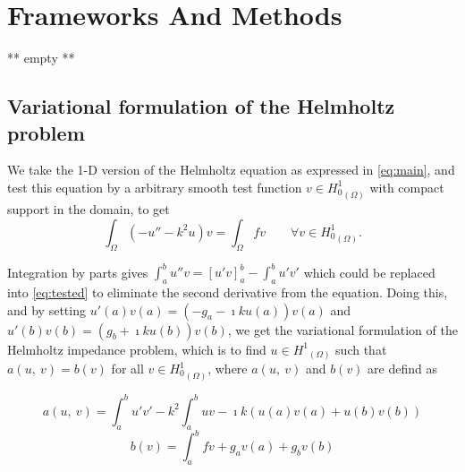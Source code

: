 \section{Frameworks And Methods}\label{sec:frameworks}
** empty **

\subsection{Variational formulation of the Helmholtz problem}\label{sec:variational}

We take the 1-D version of the Helmholtz equation as expressed in \autoref{eq:main}, and test this equation by a arbitrary smooth test function $v \in {H_{0}^{1} }_{(\Omega)}$ with compact support in the domain, to get
\begin{equation}
    \label{eq:tested}
    \int_{\Omega}{{(-u'' - k^2u)}v} = \int_{\Omega}{fv} \qquad \forall v \in {H_{0}^{1} }_{(\Omega)}.
\end{equation}

Integration by parts gives $\int_{a}^{b}{u''v} = [u'v]_{a}^{b} - \int_{a}^{b}{u'v'}$ which could be replaced into \autoref{eq:tested} to eliminate the second derivative from the equation. Doing this, and by setting $u'(a)v(a) = (-g_a-\imath ku(a))v(a)$ and $u'(b)v(b) = (g_b+\imath ku(b))v(b)$, we get the variational formulation of the Helmholtz impedance problem, which is to find $u \in {H^{1} }_{(\Omega)}$ such that $a(u,\:v) = b(v)$ for all $v \in {H_{0}^{1} }_{(\Omega)}$, where $a(u,\:v)$ and $b(v)$ are defind as

\begin{equation}
    \label{eq:varlhs}
    a(u,\:v) = \int_{a}^{b}{u'v'} - k^2 \int_{a}^{b}{uv} - \imath k (u(a)v(a) + u(b)v(b))
\end{equation}
\begin{equation}
    \label{eq:varrhs}
    b(v) = \int_{a}^{b}{fv} + g_a v(a) + g_b v(b)
\end{equation}

